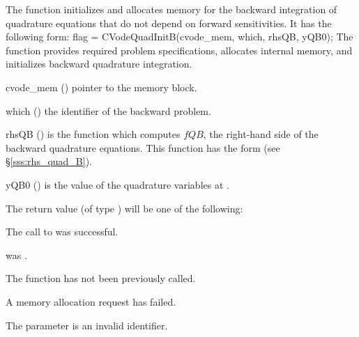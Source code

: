 The function  initializes and allocates memory for the backward
integration of quadrature equations that do not depend on forward sensitivities.
It has the following form:
{
flag = CVodeQuadInitB(cvode\_mem, which, rhsQB, yQB0);
}
{
  The function  provides required problem specifications,
  allocates internal memory, and initializes backward quadrature integration.
}
{
  \begin{args}
  \item[cvode\_mem] ()
    pointer to the {\cvodes} memory block.
  \item[which] ()
    the identifier of the backward problem.
  \item[rhsQB] ()
    is the {\C} function which computes $fQB$, the right-hand side of the 
    backward quadrature equations. This function has the form 
    (see \S\ref{sss:rhs_quad_B}).
  \item[yQB0] ()
    is the value of the quadrature variables at .
  \end{args}
}
{
  The return value  (of type ) will be one of the following:
  \begin{args}
  \item[\Id{CV\_SUCCESS}]
    The call to  was successful.
  \item[\Id{CV\_MEM\_NULL}] 
     was .
  \item[\Id{CV\_NO\_ADJ}]
    The function  has not been previously called.
  \item[\Id{CV\_MEM\_FAIL}] 
    A memory allocation request has failed.
  \item[\Id{CV\_ILL\_INPUT}]
    The parameter  is an invalid identifier.
  \end{args}
}
{}


